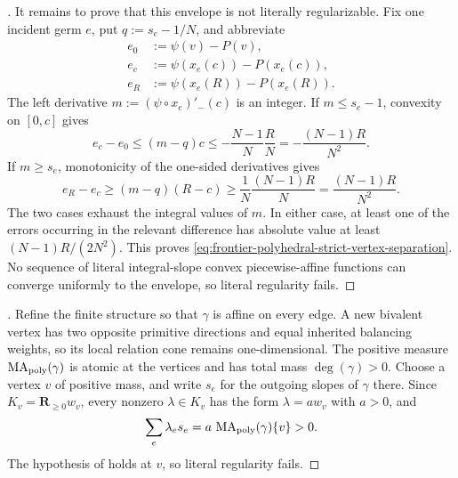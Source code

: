 \begin{proof}[]
It remains to prove that this envelope is not literally regularizable.  Fix
one incident germ $e$, put $q:=s_e-1/N$, and abbreviate
\[
 \begin{aligned}
 e_0&:=\psi(v)-P(v),\\
 e_c&:=\psi(x_e(c))-P(x_e(c)),\\
 e_R&:=\psi(x_e(R))-P(x_e(R)).
 \end{aligned}
\]
The left derivative
$m:=(\psi\circ x_e)'_-(c)$ is an integer.  If $m\leq s_e-1$, convexity on
$[0,c]$ gives
\[
 e_c-e_0
 \leq (m-q)c
 \leq-\frac{N-1}{N}\frac RN
 =-\frac{(N-1)R}{N^2}.
\]
If $m\geq s_e$, monotonicity of the one-sided derivatives gives
\[
 e_R-e_c
 \geq(m-q)(R-c)
 \geq\frac1N\frac{(N-1)R}{N}
 =\frac{(N-1)R}{N^2}.
\]
The two cases exhaust the integral values of $m$.  In either case, at least
one of the errors occurring in the relevant difference has absolute value
at least $(N-1)R/(2N^2)$.  This proves
\eqref{eq:frontier-polyhedral-strict-vertex-separation}.  No sequence of
literal integral-slope convex piecewise-affine functions can converge
uniformly to the envelope, so literal regularity fails.
\end{proof}

\begin{proof}[]
Refine the finite structure so that $\gamma$ is affine on every edge.  A
new bivalent vertex has two opposite primitive directions and equal
inherited balancing weights, so its local relation cone remains
one-dimensional.  The positive measure
$\operatorname{MA}_{\mathrm{poly}}(\gamma)$ is atomic at the vertices and has total mass
$\deg(\gamma)>0$.  Choose a vertex $v$ of positive mass, and write $s_e$
for the outgoing slopes of $\gamma$ there.  Since
$K_v=\mathbf R_{\geq0}w_v$, every nonzero $\lambda\in K_v$ has the form
$\lambda=aw_v$ with $a>0$, and
\[
                  \sum_e\lambda_es_e
                  =a\,\operatorname{MA}_{\mathrm{poly}}(\gamma)\{v\}>0.
\]
The hypothesis of
 holds
at $v$, so literal regularity fails.
\end{proof}
